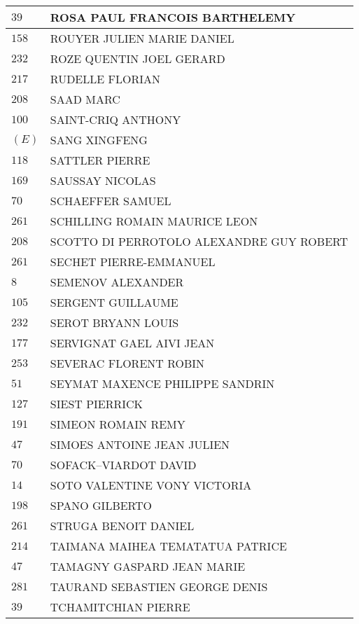 \begin{xltabular}{\linewidth}{|l|X|}
    \hline
    $39$ & ROSA PAUL FRANCOIS BARTHELEMY \\
    \hline
    $158$ & ROUYER JULIEN MARIE DANIEL \\
    \hline
    $232$ & ROZE QUENTIN JOEL GERARD \\
    \hline
    $217$ & RUDELLE FLORIAN \\
    \hline
    $208$ & SAAD MARC \\
    \hline
    $100$ & SAINT-CRIQ ANTHONY \\
    \hline
    $(E)$ & SANG XINGFENG \\
    \hline
    $118$ & SATTLER PIERRE \\
    \hline
    $169$ & SAUSSAY NICOLAS \\
    \hline
    $70$ & SCHAEFFER SAMUEL \\
    \hline
    $261$ & SCHILLING ROMAIN MAURICE LEON \\
    \hline
    $208$ & SCOTTO DI PERROTOLO ALEXANDRE GUY ROBERT \\
    \hline
    $261$ & SECHET PIERRE-EMMANUEL \\
    \hline
    $8$ & SEMENOV ALEXANDER \\
    \hline
    $105$ & SERGENT GUILLAUME \\
    \hline
    $232$ & SEROT BRYANN LOUIS \\
    \hline
    $177$ & SERVIGNAT GAEL AIVI JEAN \\
    \hline
    $253$ & SEVERAC FLORENT ROBIN \\
    \hline
    $51$ & SEYMAT MAXENCE PHILIPPE SANDRIN \\
    \hline
    $127$ & SIEST PIERRICK \\
    \hline
    $191$ & SIMEON ROMAIN REMY \\
    \hline
    $47$ & SIMOES ANTOINE JEAN JULIEN \\
    \hline
    $70$ & SOFACK--VIARDOT DAVID \\
    \hline
    $14$ & SOTO VALENTINE VONY VICTORIA \\
    \hline
    $198$ & SPANO GILBERTO \\
    \hline
    $261$ & STRUGA BENOIT DANIEL \\
    \hline
    $214$ & TAIMANA MAIHEA TEMATATUA PATRICE \\
    \hline
    $47$ & TAMAGNY GASPARD JEAN MARIE \\
    \hline
    $281$ & TAURAND SEBASTIEN GEORGE DENIS \\
    \hline
    $39$ & TCHAMITCHIAN PIERRE \\

\end{xltabular}
